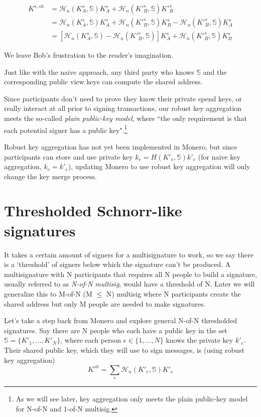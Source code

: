 \begin{align*}
    K^{s,sh} &= \mathcal{H}_n(K^{s}_A,\mathbb{S})K^{s}_A + \mathcal{H}_n(K'^{s}_B,\mathbb{S})K'^{s}_B \\
             &= \mathcal{H}_n(K^{s}_A,\mathbb{S})K^{s}_A + \mathcal{H}_n(K'^{s}_B,\mathbb{S})K^{s}_B - \mathcal{H}_n(K'^{s}_B,\mathbb{S})K^{s}_A \\
             &= [\mathcal{H}_n(K^{s}_A,\mathbb{S}) - \mathcal{H}_n(K'^{s}_B,\mathbb{S})]K^{s}_A + \mathcal{H}_n(K'^{s}_B,\mathbb{S})K^{s}_B
\end{align*}

We leave Bob's frustration to the reader's imagination.

Just like with the naive approach, any third party who knows $\mathbb{S}$ and the corresponding public view keys can compute the shared address.

Since participants don't need to prove they know their private spend keys, or really interact at all prior to signing transactions, our robust key aggregation meets the so-called {\em plain public-key model}, where ``the only requirement is that each potential signer has a public key"\cite{maxwell2018simple}.\footnote{As we will see later, key aggregation only meets the plain public-key model for N-of-N and 1-of-N multisig.}

Robust key aggregation has not yet been implemented in Monero, but since participants can store and use private key $k_e = H(K'_e,\mathbb{S})k'_e$ (for naive key aggregation, $k_e = k'_e$), updating Monero to use robust key aggregation will only change the key merge process.



\section{Thresholded Schnorr-like signatures}
\label{sec:threshold-schnorr}

It takes a certain amount of signers for a multisignature to work, so we say there is a `threshold' of signers below which the signature can't be produced. A multisignature with N participants that requires all N people to build a signature, usually referred to as {\em N-of-N multisig}, would have a threshold of N. Later we will generalize this to M-of-N (M $\leq$ N) multisig where N participants create the shared address but only M people are needed to make signatures.

Let's take a step back from Monero and explore general N-of-N thresholded signatures. Say there are N people who each have a public key in the set $\mathbb{S} = \{K'_1,...,K'_N\}$, where each person $e \in \{1,...,N\}$ knows the private key $k'_e$. Their shared public key, which they will use to sign messages, is (using robust key aggregation)
\[ K^{sh} = \sum_e \mathcal{H}_n(K'_e,\mathbb{S})K'_e \]


